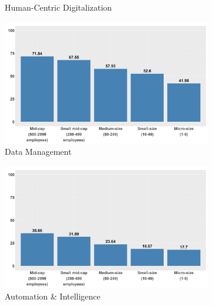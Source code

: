 \documentclass[12pt]{report}
\begin{document}
\begin{figure}[p]
\begin{subfigure}[b]{0.48\textwidth}
        \caption{Human-Centric Digitalization}
        \label{fig:dma_size_human_centric_digitalization}
    \end{subfigure}
    \hfill
    \begin{subfigure}[b]{0.48\textwidth}
        \centering
        \includegraphics[width=\linewidth]{../Output/avg_dmascore_by_size_data_gov.png}
        \caption{Data Management}
        \label{fig:dma_size_data_management}
    \end{subfigure}
    \vfill
    \begin{subfigure}[b]{0.48\textwidth}
        \centering
        \includegraphics[width=\linewidth]{../Output/avg_dmascore_by_size_automation_ai.png}
        \caption{Automation \& Intelligence}
        \label{fig:dma_size_automation_intelligence}
    \end{subfigure}
    \hfill
    \begin{subfigure}[b]{0.48\textwidth}
        \centering

\end{subfigure}
\end{figure}
\end{document}
